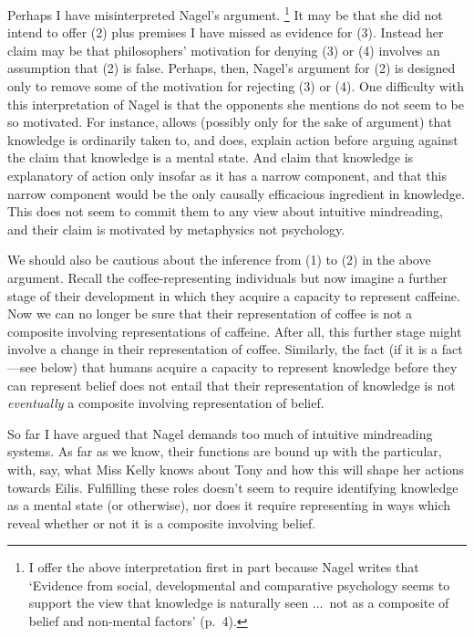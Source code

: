 \documentclass[11pt,a4paper]{extarticle}
\begin{document}
Perhaps I have misinterpreted Nagel's argument.%
\footnote{
I offer the above interpretation first in part because
Nagel writes that
`Evidence from social, developmental and comparative psychology seems to support the view that knowledge is naturally seen  ...\ not as a composite of belief and non-mental factors' (p.\ 4).
}
It may be that she did not intend to offer (2) plus premises I have missed as evidence for  (3).
Instead her claim may be that
philosophers' motivation for denying (3) or (4) 
involves an assumption that (2) is false.
Perhaps, then, Nagel's argument for (2) is  designed only to remove some of the motivation for rejecting (3) or (4).
One difficulty with this interpretation of Nagel is that the opponents she mentions do not seem to be so motivated.
For instance, 
 \citet[p.\ 35]{fricker_2009} allows (possibly only for the sake of argument) that knowledge  is ordinarily taken to, and does, explain action 
before arguing against
 the claim that knowledge is a mental state.
And \citet[pp.\ 39-40]{magnus_williamson_2003}
claim that knowledge is explanatory of action only insofar  as it has a narrow component,
and that this narrow component would be the only causally efficacious ingredient in knowledge.
This does not seem to commit them to any view about intuitive mindreading, 
and their claim is motivated by metaphysics not psychology.

We should also be cautious about the inference from (1) to (2) in the above argument.
Recall the coffee-representing individuals but now imagine a further stage of their development in which they acquire a capacity to represent caffeine.
Now we can no longer be sure that their representation of coffee is not a composite involving representations of caffeine.
After all, this further stage might involve a change in their representation of coffee.
Similarly, the fact (if it is a fact---see below) that humans acquire a capacity to represent knowledge before they can represent belief does not entail that their representation of knowledge is not \emph{eventually} a composite involving representation of belief.

So far I have argued that Nagel demands too much of intuitive mindreading systems.
As far as we know, their functions are bound up with the particular, with, say, what Miss Kelly knows about Tony and how this will shape her actions towards Eilis.
Fulfilling these roles doesn't seem to require identifying knowledge as a mental state (or otherwise),
nor does it require representing in ways which reveal whether or not it is a composite involving belief.
\end{document}
